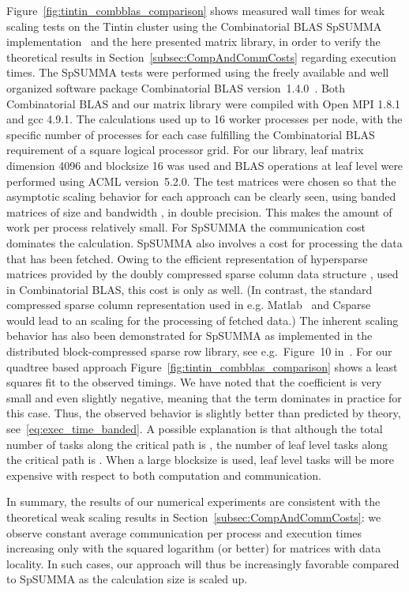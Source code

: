 \documentclass{elsarticle}
\begin{document}
Figure~\ref{fig:tintin_combblas_comparison} shows measured wall times
for weak scaling tests on the Tintin cluster using the Combinatorial
BLAS SpSUMMA implementation~\cite{CombBLAS} and the here presented
matrix library, in order to verify the theoretical results in
Section~\ref{subsec:CompAndCommCosts} regarding execution times.  The
SpSUMMA tests were performed using the freely available and well
organized software package Combinatorial BLAS
version~1.4.0~\cite{CombBLAS}.  Both Combinatorial BLAS and our matrix
library were compiled with Open MPI 1.8.1 and gcc 4.9.1.
The calculations used up to 16 worker processes per node, with the
specific number of processes for each case fulfilling the
Combinatorial BLAS requirement of a square logical processor grid. For
our library, leaf matrix dimension 4096 and blocksize 16 was used and
BLAS operations at leaf level were performed using ACML version~5.2.0.
The test matrices were chosen so that the asymptotic scaling behavior
for each approach can be clearly seen, using banded matrices of size
 and bandwidth , in double precision.
This makes the amount of work per process
 relatively small.
For SpSUMMA the  communication cost dominates
the calculation. SpSUMMA also involves a cost for processing the data
that has been fetched. Owing to the efficient representation of
hypersparse matrices provided by the doubly compressed sparse column
data structure \cite{dcsc2008}, used in Combinatorial BLAS, this cost
is only  as well. (In contrast, the standard
compressed sparse column representation used in
e.g. Matlab~\cite{matlab_csc1992} and Csparse~\cite{csparse2006} would
lead to an  scaling for the processing of fetched
data.)  The inherent  scaling behavior has also been
demonstrated for SpSUMMA as implemented in the distributed
block-compressed sparse row library, see e.g.~Figure~10
in~\cite{Borstnik2014}.
For our quadtree based approach
Figure~\ref{fig:tintin_combblas_comparison} shows a  least squares fit to the observed timings. We have
noted that the  coefficient is very small and even slightly
negative, meaning that the  term dominates in practice for
this case. Thus, the observed behavior is slightly better than
predicted by theory, see~\eqref{eq:exec_time_banded}. A possible
explanation is that although the total number of tasks along the
critical path is , the number of leaf level
tasks along the critical path is . When a large
blocksize is used, leaf level tasks will be more expensive with
respect to both computation and communication.

In summary, the results of our numerical experiments are consistent
with the theoretical weak scaling results in
Section~\ref{subsec:CompAndCommCosts}: we observe constant average
communication per process and execution times increasing only with the
squared logarithm (or better) for matrices with data locality.  In
such cases, our approach will thus be increasingly favorable compared
to SpSUMMA as the calculation size is scaled up.
\end{document}
